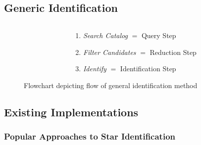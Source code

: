 \documentclass[11pt]{beamer}
\begin{document}
    \subsection{Generic Identification}\label{subsec:genericIdentification}
    \begin{frame}
        \begin{figure}
            \begin{columns}
                \begin{column}{0.4\linewidth}
                    \centering{\vspace*{-5pt}\scalebox{.55}{}}
                \end{column}
                \begin{column}{0.6\linewidth}
                    \caption{Flowchart depicting flow of general identification method} \bigskip
                    \begin{enumerate}
                        \item \textit{Search Catalog} $=$ Query Step \medskip
                        \item \textit{Filter Candidates} $=$ Reduction Step \medskip
                        \item \textit{Identify} $=$ Identification Step \medskip
                    \end{enumerate}
                \end{column}
            \end{columns}
        \end{figure}
    \end{frame}

    \subsection{Existing Implementations}\label{subsec:existingImplementations}
    \begin{frame}
        \frametitle{Popular Approaches to Star Identification}
        \begin{table}
            \centering{\tiny\hspace*{-10pt}} \bigskip \bigskip
        \end{table}
    \end{frame}
\end{document}
